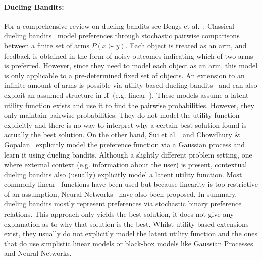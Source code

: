 \documentclass{article}
\begin{document}
\paragraph{Dueling Bandits:} For a comprehensive review on dueling bandits see Bengs et al.~\cite{bengs2021preference}. Classical dueling bandits~\cite{yue2012k} model preferences through stochastic pairwise comparisons between a finite set of arms $P(x \succ y)$. Each object is treated as an arm, and feedback is obtained in the form of noisy outcomes indicating which of two arms is preferred. However, since they need to model each object as an arm, this model is only applicable to a pre-determined fixed set of objects. An extension to an infinite amount of arms is possible via utility-based dueling bandits~\cite{Yue2009} and can also exploit an assumed structure in $\mathcal{X}$ (e.g. linear~\cite{ailon2014reducing}). These models assume a latent utility function exists and use it to find the pairwise probabilities. However, they only maintain pairwise probabilities. They do not model the utility function explicitly and there is no way to interpret why a certain best-solution found is actually the best solution. On the other hand, Sui et al.~\cite{sui2017multi} and Chowdhury \& Gopalan~\cite{chowdhury2017kernelized} explicitly model the preference function via a Gaussian process and learn it using dueling bandits. Although a slightly different problem setting, one where external context (e.g. information about the user) is present, contextual dueling bandits also (usually) explicitly model a latent utility function. Most commonly linear~\cite{li2024feel, pmlr-v162-bengs22a} functions have been used but because linearity is too restrictive of an assumption, Neural Networks~\cite{verma2024neural} have also been proposed. In summary, dueling bandits mostly represent preferences via stochastic binary preference relations. This approach only yields the best solution, it does not give any explanation as to why that solution is the best. Whilst utility-based extensions exist, they usually do not explicitly model the latent utility function and the ones that do use simplistic linear models or black-box models like Gaussian Processes and Neural Networks.
\end{document}
